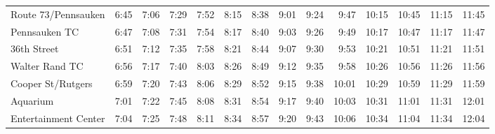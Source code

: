 \begin{center}
\begin{tabular}{@{}lrrrrrrrrrrrrr@{}}
Route 73/Pennsauken & 6:45 & 7:06 & 7:29 & 7:52 & 8:15 & 8:38 & 9:01 & 9:24 & 9:47 & 10:15 & 10:45 & 11:15 & 11:45 \\
Pennsauken TC & 6:47 & 7:08 & 7:31 & 7:54 & 8:17 & 8:40 & 9:03 & 9:26 & 9:49 & 10:17 & 10:47 & 11:17 & 11:47 \\
36th Street & 6:51 & 7:12 & 7:35 & 7:58 & 8:21 & 8:44 & 9:07 & 9:30 & 9:53 & 10:21 & 10:51 & 11:21 & 11:51 \\
Walter Rand TC & 6:56 & 7:17 & 7:40 & 8:03 & 8:26 & 8:49 & 9:12 & 9:35 & 9:58 & 10:26 & 10:56 & 11:26 & 11:56 \\
Cooper St/Rutgers & 6:59 & 7:20 & 7:43 & 8:06 & 8:29 & 8:52 & 9:15 & 9:38 & 10:01 & 10:29 & 10:59 & 11:29 & 11:59 \\
Aquarium & 7:01 & 7:22 & 7:45 & 8:08 & 8:31 & 8:54 & 9:17 & 9:40 & 10:03 & 10:31 & 11:01 & 11:31 & 12:01 \\
Entertainment Center & 7:04 & 7:25 & 7:48 & 8:11 & 8:34 & 8:57 & 9:20 & 9:43 & 10:06 & 10:34 & 11:04 & 11:34 & 12:04 \\
\bottomrule\end{tabular}\end{center}
